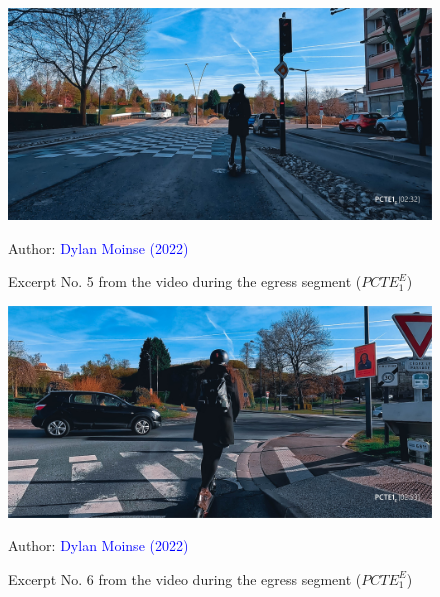     \begin{figure}[h!]\vspace*{4pt}
        \caption*{Excerpt No. 5 from the video during the egress segment (\(PCTE^{E}_{1}\))}
        \centerline{\includegraphics[width=0.75\columnwidth]{src/Figures/Annexes/Extrait_Video_PCTE1_Egress_5.jpg}}
        \vspace{5pt}
        \begin{flushright}\scriptsize{
        Author: \textcolor{blue}{Dylan Moinse (2022)}
        }\end{flushright}
    \end{figure}

    \begin{figure}[h!]\vspace*{4pt}
        \caption*{Excerpt No. 6 from the video during the egress segment (\(PCTE^{E}_{1}\))}
        \centerline{\includegraphics[width=0.75\columnwidth]{src/Figures/Annexes/Extrait_Video_PCTE1_Egress_6.jpg}}
        \vspace{5pt}
        \begin{flushright}\scriptsize{
        Author: \textcolor{blue}{Dylan Moinse (2022)}
        }\end{flushright}
    \end{figure}

